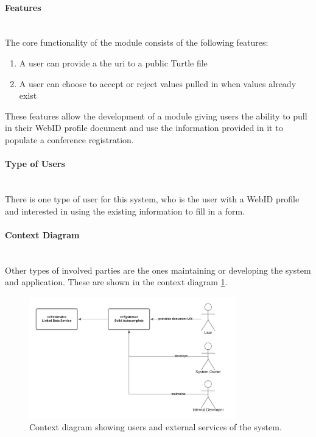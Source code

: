 \vspace{0.5cm}
\paragraph{Features}\mbox{}\\

The core functionality of the module consists of the following features: 

\vspace{-3mm}
\begin{enumerate}
    \item A user can provide a the \gls{uri} to a public Turtle file
    \item A user can choose to accept or reject values pulled in when values already exist
\end{enumerate}
\vspace{-3mm}

These features allow the development of a module giving users the ability to pull in their WebID profile document and use the information provided in it to populate a conference registration.
\vspace{0.5cm}
\paragraph{Type of Users}\mbox{}\\

There is one type of user for this system, who is the user with a WebID profile and interested in using the existing information to fill in a form.
\vspace{0.5cm}
\paragraph{Context Diagram}\mbox{}\\

Other types of involved parties are the ones maintaining or developing the system and application. These are shown in the context diagram \ref{fig:poc-autocomplete-context_diagram}.

\begin{figure}[H]
    \centering
    \includegraphics[width=0.8\textwidth]{prototype/graphs/poc-autocomplete-context_diagram.png}
    \caption{Context diagram showing users and external services of the system.}
    \label{fig:poc-autocomplete-context_diagram}
\end{figure}
\vspace{0.5cm}
